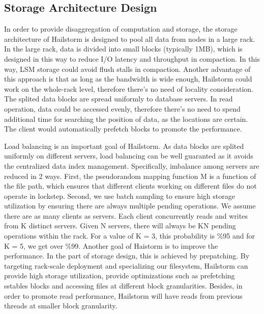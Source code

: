 \documentclass[a4paper,10pt,twoside]{article}
\begin{document}
\subsection{Storage Architecture Design}
\par
In order to provide disaggregation of computation and storage, the storage architecture of Hailstorm is designed to pool all data from nodes in a large rack.
In the large rack, data is divided into small blocks (typically 1MB), which is designed in this way to reduce I/O latency and throughput in compaction.
In this way, LSM storage could avoid flush stalls in compaction. 
Another advantage of this approach is that as long as the bandwidth is wide enough, Hailstorm could work on the whole-rack level, 
therefore there's no need of locality consideration.
The splited data blocks are spread uniformly to database servers. 
In read operation, data could be accessed evenly, therefore there's no need to spend additional time for searching the position of data, as the locations are certain.
The client would automatically prefetch blocks to promote the performance.
\par
Load balancing is an important goal of Hailstorm. 
As data blocks are splited uniformly on different servers, load balancing can be well guaranted as it avoids the centralized data index management.
Specifically, imbalance among servers are reduced in 2 ways.
First, the pseudorandom mapping function M is a function of the file path, which ensures that different clients working on different files do not operate in lockstep.
Second, we use batch sampling to ensure high storage utilization by ensuring there are always multiple pending operations.
We assume there are as many clients as servers. Each client concurrently reads and writes from K distinct servers. 
Given N servers, there will always be KN pending operations within the rack.
For a value of K = 3, this probability is $\%$95 and for K = 5, we get over $\%$99. \cite{mainpaper}
Another goal of Haistorm is to improve the performance.
In the part of storage design, this is achieved by prepatching. 
By targeting rack-scale deployment and specializing our filesystem, Hailstorm can provide high storage utilization, provide optimizations such as prefetching sstables blocks and accessing files at different block granularities.
Besides, in order to promote read performance, Hailstorm will have reads from previous threads at smaller block granularity.
\end{document}

